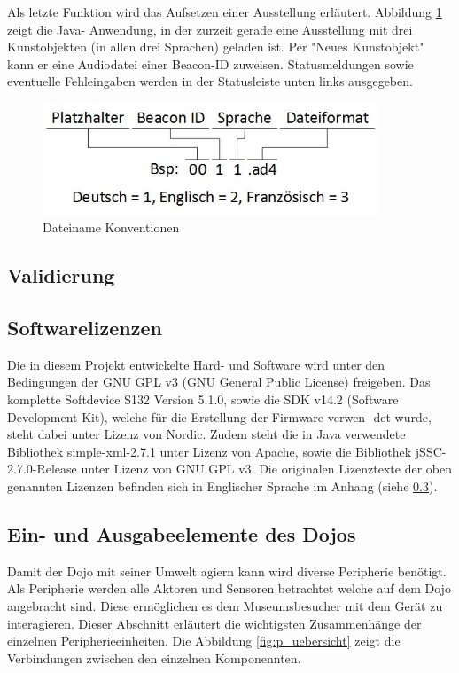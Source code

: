 Als letzte Funktion wird das Aufsetzen einer Ausstellung erläutert. Abbildung \ref{fig:soft_6} zeigt die Java- Anwendung, in der zurzeit gerade eine Ausstellung mit drei Kunstobjekten (in allen drei Sprachen) geladen ist. Per "Neues Kunstobjekt" kann er eine Audiodatei einer Beacon-ID zuweisen. Statusmeldungen sowie eventuelle Fehleingaben werden in der Statusleiste unten links ausgegeben.
\begin{figure}[h]
	\centering
	\includegraphics[width=10cm]{graphics/Dateiname_Konvention.jpeg}
	\caption{Dateiname Konventionen}
	\label{fig:soft_6}
\end{figure}
\subsection{Validierung}
\subsection{Softwarelizenzen}
Die in diesem Projekt entwickelte Hard- und Software wird unter den Bedingungen der GNU
GPL v3 (GNU General Public License) freigeben. Das komplette Softdevice S132 Version 5.1.0,
sowie die SDK v14.2 (Software Development Kit), welche für die Erstellung der Firmware verwen-
det wurde, steht dabei unter Lizenz von Nordic. Zudem steht die in Java verwendete Bibliothek
simple-xml-2.7.1 unter Lizenz von Apache, sowie die Bibliothek jSSC-2.7.0-Release unter Lizenz
von GNU GPL v3.
Die originalen Lizenztexte der oben genannten Lizenzen befinden sich in Englischer Sprache
im Anhang (siehe \ref{}).

\clearpage








\subsection{Ein- und Ausgabeelemente des Dojos}

Damit der Dojo mit seiner Umwelt agiern kann wird diverse Peripherie benötigt. Als Peripherie werden alle Aktoren und Sensoren betrachtet welche auf dem Dojo angebracht sind. Diese ermöglichen es dem Museumsbesucher mit dem Gerät zu interagieren. Dieser Abschnitt erläutert die wichtigsten Zusammenhänge der einzelnen Peripherieeinheiten. Die Abbildung \ref{fig:p_uebersicht} zeigt die Verbindungen zwischen den einzelnen Komponennten.

